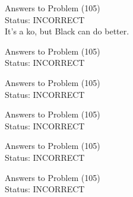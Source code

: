 \documentclass[11pt]{article}
\begin{document}
\begin{minipage}[t]{0.5\textwidth}
  {\centering
  
  Answers to Problem (105)\\
  Status: INCORRECT\\
  It's a ko, but Black can do better.\\
  }
\end{minipage}
\begin{minipage}[t]{0.5\textwidth}
  {\centering
  
  Answers to Problem (105)\\
  Status: INCORRECT\\
  
  }
\end{minipage}
\begin{minipage}[t]{0.5\textwidth}
  {\centering
  
  Answers to Problem (105)\\
  Status: INCORRECT\\
  
  }
\end{minipage}
\begin{minipage}[t]{0.5\textwidth}
  {\centering
  
  Answers to Problem (105)\\
  Status: INCORRECT\\
  
  }
\end{minipage}
\begin{minipage}[t]{0.5\textwidth}
  {\centering
  
  Answers to Problem (105)\\
  Status: INCORRECT\\
  
  }
\end{minipage}
\begin{minipage}[t]{0.5\textwidth}
  {\centering
  
  Answers to Problem (105)\\
  Status: INCORRECT\\
  
  }
\end{minipage}
\end{document}
